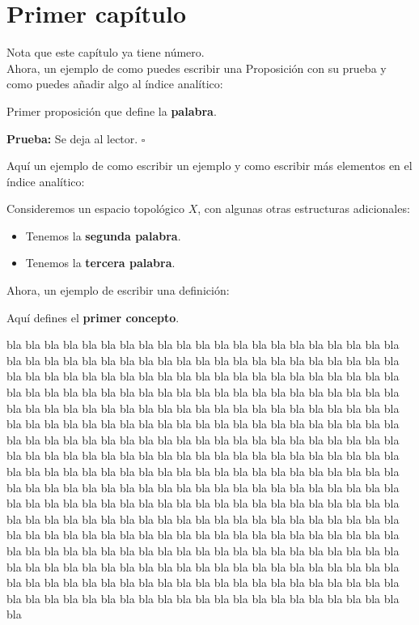 \documentclass[12pt]{book}%
\theoremstyle{newstyle}%
\newcommand\fin[1]{\leavevmode\unskip\penalty9999 \hbox{}\nobreak\hfill\quad\hbox{#1}}
\newcommand\FINPBA{\fin{$\square$}}
\newenvironment{pba}{\noindent \textbf{Prueba:}}{\FINPBA}
\begin{document}
\chapter{Primer capítulo}

Nota que este capítulo ya tiene número. \\

Ahora, un ejemplo de como puedes escribir una Proposición con su prueba y como puedes añadir algo al índice analítico:


\begin{prop}
Primer proposición que define la \textbf{palabra}.
\end{prop}
\begin{pba}
Se deja al lector.
\end{pba}

Aquí un ejemplo de como escribir un ejemplo y como escribir más elementos en el índice analítico:

\begin{ej}
Consideremos un espacio topológico $X$, con algunas otras estructuras adicionales: 
\begin{itemize}
\item Tenemos la \textbf{segunda palabra}.

\item Tenemos la \textbf{tercera palabra}.
\end{itemize}
\end{ej}

Ahora, un ejemplo de escribir una definición:

\begin{df}
Aquí defines el \textbf{primer concepto}.
\end{df}

bla bla bla bla bla bla bla bla bla bla bla bla bla bla bla bla bla bla bla bla bla bla bla bla bla bla bla bla bla bla bla bla bla bla bla bla bla bla bla bla bla bla bla bla bla bla bla bla bla bla bla bla bla bla bla bla bla bla bla bla bla bla bla bla bla bla bla bla bla bla bla bla bla bla bla bla bla bla bla bla bla bla bla bla bla bla bla bla bla bla bla bla bla bla bla bla bla bla bla bla bla bla bla bla bla bla bla bla bla bla bla bla bla bla bla bla bla bla bla bla bla bla bla bla bla bla bla bla bla bla bla bla bla bla bla bla bla bla bla bla bla bla bla bla bla bla bla bla bla bla bla bla bla bla bla bla bla bla bla bla bla bla bla bla bla bla bla bla bla bla bla bla bla bla bla bla bla bla bla bla bla bla bla bla bla bla bla bla bla bla bla bla bla bla bla bla bla bla bla bla bla bla bla bla bla bla bla bla bla bla bla bla bla bla bla bla bla bla bla bla bla bla bla bla bla bla bla bla bla bla bla bla bla bla bla bla bla bla bla bla bla bla bla bla bla bla bla bla bla bla bla bla bla bla bla bla bla bla bla bla bla bla bla bla bla bla bla bla bla bla bla bla bla bla bla bla bla bla bla bla bla bla bla bla bla bla bla bla bla bla bla bla bla bla bla bla bla bla bla bla bla bla bla bla bla bla bla bla bla bla bla bla bla bla bla bla bla bla bla bla bla bla bla bla bla bla bla bla bla bla bla bla bla bla bla bla bla bla bla bla bla bla bla bla bla bla bla bla bla bla bla bla bla bla bla bla bla bla 
\end{document}
